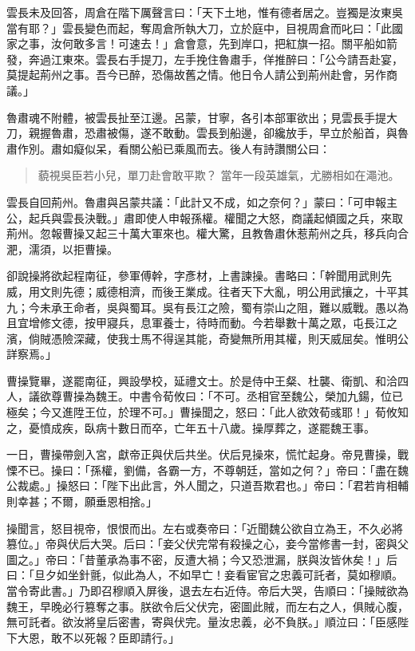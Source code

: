 雲長未及回答，周倉在階下厲聲言曰：「天下土地，惟有德者居之。豈獨是汝東吳當有耶？」雲長變色而起，奪周倉所執大刀，立於庭中，目視周倉而叱曰：「此國家之事，汝何敢多言！可速去！」倉會意，先到岸口，把紅旗一招。關平船如箭發，奔過江東來。雲長右手提刀，左手挽住魯肅手，佯推醉曰：「公今請吾赴宴，莫提起荊州之事。吾今已醉，恐傷故舊之情。他日令人請公到荊州赴會，另作商議。」

魯肅魂不附體，被雲長扯至江邊。呂蒙，甘寧，各引本部軍欲出；見雲長手提大刀，親握魯肅，恐肅被傷，遂不敢動。雲長到船邊，卻纔放手，早立於船首，與魯肅作別。肅如癡似呆，看關公船已乘風而去。後人有詩讚關公曰：

\begin{quote}
藐視吳臣若小兒，單刀赴會敢平欺？
當年一段英雄氣，尤勝相如在澠池。
\end{quote}

雲長自回荊州。魯肅與呂蒙共議：「此計又不成，如之奈何？」蒙曰：「可申報主公，起兵與雲長決戰。」肅即使人申報孫權。權聞之大怒，商議起傾國之兵，來取荊州。忽報曹操又起三十萬大軍來也。權大驚，且教魯肅休惹荊州之兵，移兵向合淝，濡須，以拒曹操。

卻說操將欲起程南征，參軍傅幹，字彥材，上書諫操。書略曰：「幹聞用武則先威，用文則先德；威德相濟，而後王業成。往者天下大亂，明公用武攘之，十平其九；今未承王命者，吳與蜀耳。吳有長江之險，蜀有崇山之阻，難以威戰。愚以為且宜增修文德，按甲寢兵，息軍養士，待時而動。今若舉數十萬之眾，屯長江之濱，倘賊憑險深藏，使我士馬不得逞其能，奇變無所用其權，則天威屈矣。惟明公詳察焉。」

曹操覽畢，遂罷南征，興設學校，延禮文士。於是侍中王粲、杜襲、衛凱、和洽四人，議欲尊曹操為魏王。中書令荀攸曰：「不可。丞相官至魏公，榮加九鍚，位已極矣；今又進陞王位，於理不可。」曹操聞之，怒曰：「此人欲效荀彧耶！」荀攸知之，憂憤成疾，臥病十數日而卒，亡年五十八歲。操厚葬之，遂罷魏王事。

一日，曹操帶劍入宮，獻帝正與伏后共坐。伏后見操來，慌忙起身。帝見曹操，戰慄不已。操曰：「孫權，劉備，各霸一方，不尊朝廷，當如之何？」帝曰：「盡在魏公裁處。」操怒曰：「陛下出此言，外人聞之，只道吾欺君也。」帝曰：「君若肯相輔則幸甚；不爾，願垂恩相捨。」

操聞言，怒目視帝，恨恨而出。左右或奏帝曰：「近聞魏公欲自立為王，不久必將篡位。」帝與伏后大哭。后曰：「妾父伏完常有殺操之心，妾今當修書一封，密與父圖之。」帝曰：「昔董承為事不密，反遭大禍；今又恐泄漏，朕與汝皆休矣！」后曰：「旦夕如坐針氈，似此為人，不如早亡！妾看宦官之忠義可託者，莫如穆順。當令寄此書。」乃即召穆順入屏後，退去左右近侍。帝后大哭，告順曰：「操賊欲為魏王，早晚必行篡奪之事。朕欲令后父伏完，密圖此賊，而左右之人，俱賊心腹，無可託者。欲汝將皇后密書，寄與伏完。量汝忠義，必不負朕。」順泣曰：「臣感陛下大恩，敢不以死報？臣即請行。」


